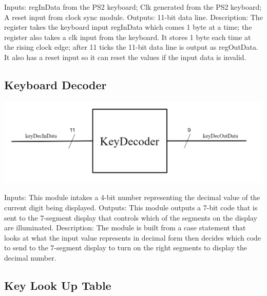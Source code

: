 \documentclass[a4paper]{article}
\begin{document}
Inputs: \newline
	regInData from the PS2 keyboard;\newline
    Clk generated from the PS2 keyboard;\newline
    A reset input from clock sync module.\newline\newline
Outputs: 11-bit data line.
\newline\newline
Description: The register takes the keyboard input regInData which comes 1 byte at a time; the register also takes a clk input from the keyboard. It stores 1 byte each time at the rising clock edge; after 11 ticks the 11-bit data line is output as regOutData. It also has a reset input so it can reset the values if the input data is invalid.  


\subsection{Keyboard Decoder}

    \includegraphics[width=6in]{./Images/DiagramsYang/keyDec.png}


Inputs: This module intakes a 4-bit number representing the decimal value of the current digit being displayed.
\newline\newline
Outputs: This module outputs a 7-bit code that is sent to the 7-segment display that controls which of the segments on the display are illuminated.
\newline\newline
Description: The module is built from a case statement that looks at what the input value represents in decimal form then decides which code to send to the 7-segment display to turn on the right segments to display the decimal number.


\subsection{Key Look Up Table}
\end{document}
